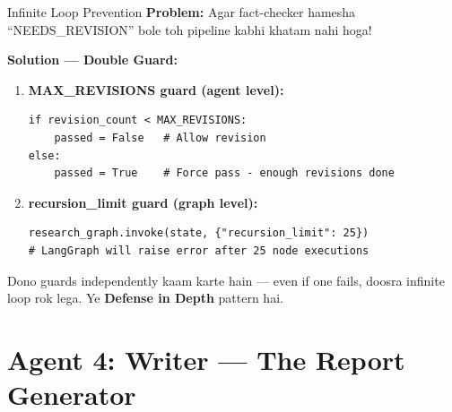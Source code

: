 \documentclass[11pt,a4paper,twoside]{report}
\begin{document}
\begin{dangerbox}{Infinite Loop Prevention}
\textbf{Problem:} Agar fact-checker hamesha ``NEEDS\_REVISION'' bole toh pipeline kabhi khatam nahi hoga!

\textbf{Solution --- Double Guard:}
\begin{enumerate}
    \item \textbf{MAX\_REVISIONS guard (agent level):}
    \begin{lstlisting}[style=pythonstyle]
if revision_count < MAX_REVISIONS:
    passed = False   # Allow revision
else:
    passed = True    # Force pass - enough revisions done
    \end{lstlisting}

    \item \textbf{recursion\_limit guard (graph level):}
    \begin{lstlisting}[style=pythonstyle]
research_graph.invoke(state, {"recursion_limit": 25})
# LangGraph will raise error after 25 node executions
    \end{lstlisting}
\end{enumerate}

Dono guards independently kaam karte hain --- even if one fails, doosra infinite loop rok lega. Ye \textbf{Defense in Depth} pattern hai.
\end{dangerbox}

\section{Agent 4: Writer --- The Report Generator}
\end{document}
